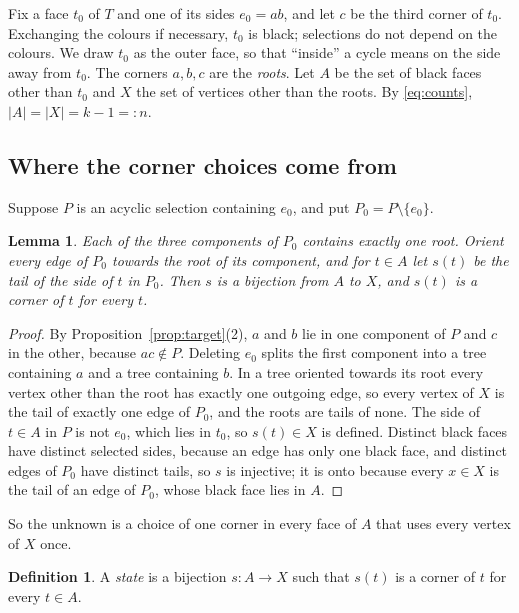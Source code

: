 \documentclass[10pt]{amsart}
\numberwithin{equation}{section}
\newtheorem{lemma}[equation]{Lemma}
\theoremstyle{definition}
\newtheorem{definition}[equation]{Definition}
\theoremstyle{remark}
\newcommand{\T}{T}
\begin{document}
Fix a face $t_0$ of $\T$ and one of its sides $e_0=ab$, and let $c$ be the third corner of $t_0$.
Exchanging the colours if necessary, $t_0$ is black; selections do not depend on the colours.
We draw $t_0$ as the outer face, so that ``inside'' a cycle means on the side away from $t_0$.
The corners $a,b,c$ are the \emph{roots}.
Let $A$ be the set of black faces other than $t_0$ and $X$ the set of vertices other than the roots.
By \eqref{eq:counts}, $|A|=|X|=k-1=:n$.

\subsection*{Where the corner choices come from}
Suppose $P$ is an acyclic selection containing $e_0$, and put $P_0=P\setminus\{e_0\}$.

\begin{lemma}\label{lem:selections-give-states}
Each of the three components of $P_0$ contains exactly one root.
Orient every edge of $P_0$ towards the root of its component, and for $t\in A$ let $s(t)$ be the tail of the side of $t$ in $P_0$.
Then $s$ is a bijection from $A$ to $X$, and $s(t)$ is a corner of $t$ for every $t$.
\end{lemma}

\begin{proof}
By Proposition~\ref{prop:target}(2), $a$ and $b$ lie in one component of $P$ and $c$ in the other, because $ac\notin P$.
Deleting $e_0$ splits the first component into a tree containing $a$ and a tree containing $b$.
In a tree oriented towards its root every vertex other than the root has exactly one outgoing edge, so every vertex of $X$ is the tail of exactly one edge of $P_0$, and the roots are tails of none.
The side of $t\in A$ in $P$ is not $e_0$, which lies in $t_0$, so $s(t)\in X$ is defined.
Distinct black faces have distinct selected sides, because an edge has only one black face, and distinct edges of $P_0$ have distinct tails, so $s$ is injective; it is onto because every $x\in X$ is the tail of an edge of $P_0$, whose black face lies in $A$.
\end{proof}

So the unknown is a choice of one corner in every face of $A$ that uses every vertex of $X$ once.

\begin{definition}
A \emph{state} is a bijection $s\colon A\to X$ such that $s(t)$ is a corner of $t$ for every $t\in A$.
\end{definition}
\end{document}
